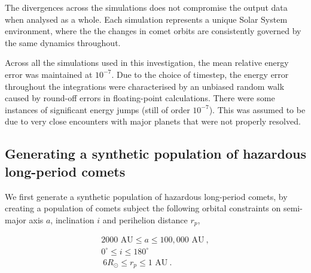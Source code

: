 The divergences across the simulations does not compromise the output data when analysed as a whole. Each simulation represents a unique Solar System environment, where the the changes in comet orbits are consistently governed by the same dynamics throughout. 

Across all the simulations used in this investigation, the mean relative energy error was maintained at $10^{-7}$. Due to the choice of timestep, the energy error throughout the integrations were characterised by an unbiased random walk caused by round-off errors in floating-point calculations. There were some instances of significant energy jumps (still of order $10^{-7}$). This was assumed to be due to very close encounters with major planets that were not properly resolved.

\iffalse
\begin{figure}[t!]
    \centering
    \texttt{[image: error.pdf]}
    \caption[]{}
    \label{fig:error}
\end{figure}
\fi

\iffalse
\section{Simulating Earth observations of an impending comet impact}

\begin{equation}
    m = H + 5\log(r_{hel}r_{geo}) - 2.5\log(\phi(\theta))~.
\end{equation}
\fi



\iffalse

\subsection{Generating a synthetic population of hazardous long-period comets}

We first generate a synthetic population of hazardous long-period comets, by creating a population of comets subject the following orbital constraints on semi-major axis $a$, inclination $i$ and perihelion distance $r_p$,

\begin{equation}
    \begin{gathered}
        2000 \text{ AU} \leq a \leq 100,000 \text{ AU}~,\\
        0^{\circ} \leq i \leq 180^{\circ}~\\\
        6 R_\odot \leq r_p \leq 1 \text{ AU}~.
    \end{gathered}
\end{equation}

